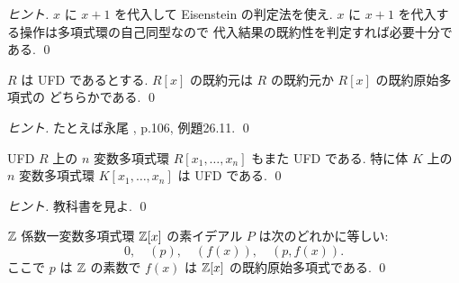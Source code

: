 \documentclass[12pt,twoside]{jarticle}
\begin{document}
\begin{proof}[ヒント]
 $x$ に $x+1$ を代入して Eisenstein の判定法を使え.
 $x$ に $x+1$ を代入する操作は多項式環の自己同型なので
 代入結果の既約性を判定すれば必要十分である.
 \qed
\end{proof}

\begin{question}[UFD係数の一変数多項式環の既約元]
 $R$ は UFD であるとする.
 $R[x]$ の既約元は $R$ の既約元か $R[x]$ の既約原始多項式の
 どちらかである.
 \qed
\end{question}

\begin{proof}[ヒント]
 たとえば永尾 \cite{nagao-1983}, p.106, 例題26.11. \qed
\end{proof}

\begin{question}[UFD上の多項式環もUFD]
 UFD $R$ 上の $n$ 変数多項式環 $R[x_1,\ldots,x_n]$ もまた UFD である.
 特に体 $K$ 上の $n$ 変数多項式環 $K[x_1,\ldots,x_n]$ は UFD である.
 \qed
\end{question}

\begin{proof}[ヒント]
 教科書を見よ. \qed
\end{proof}

\begin{question}[{$\Z[x]$} の素イデアルの分類]
\label{q:Ideal(Z[x])}
 ${\mathbb Z}$ 係数一変数多項式環 $\Z[x]$ の素イデアル $P$ は次のどれかに等しい:
 \begin{equation*}
  0, \quad (p), \quad (f(x)), \quad (p, f(x)).
 \end{equation*}
 ここで $p$ は ${\mathbb Z}$ の素数で $f(x)$ は $\Z[x]$ の既約原始多項式である.
 \qed
\end{question}
\end{document}
